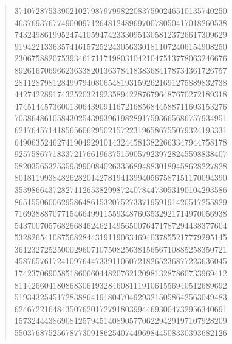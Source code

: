 \documentclass[oneside,12pt]{book}   	%
\theoremstyle{definition}
\begin{document}
\begin{spacing}{1.618}
		\begin{quote}
37107287533902102798797998220837590246510135740250 \\
46376937677490009712648124896970078050417018260538 \\
74324986199524741059474233309513058123726617309629 \\
91942213363574161572522430563301811072406154908250 \\
23067588207539346171171980310421047513778063246676 \\
89261670696623633820136378418383684178734361726757 \\
28112879812849979408065481931592621691275889832738 \\
44274228917432520321923589422876796487670272189318 \\
47451445736001306439091167216856844588711603153276 \\
70386486105843025439939619828917593665686757934951 \\
62176457141856560629502157223196586755079324193331 \\
64906352462741904929101432445813822663347944758178 \\
92575867718337217661963751590579239728245598838407 \\
58203565325359399008402633568948830189458628227828 \\
80181199384826282014278194139940567587151170094390 \\
35398664372827112653829987240784473053190104293586 \\
86515506006295864861532075273371959191420517255829 \\
71693888707715466499115593487603532921714970056938 \\
54370070576826684624621495650076471787294438377604 \\
53282654108756828443191190634694037855217779295145 \\
36123272525000296071075082563815656710885258350721 \\
45876576172410976447339110607218265236877223636045 \\
17423706905851860660448207621209813287860733969412 \\
81142660418086830619328460811191061556940512689692 \\
51934325451728388641918047049293215058642563049483 \\
62467221648435076201727918039944693004732956340691 \\
15732444386908125794514089057706229429197107928209 \\
55037687525678773091862540744969844508330393682126 \\

\end{quote}
\end{spacing}
\end{document}
